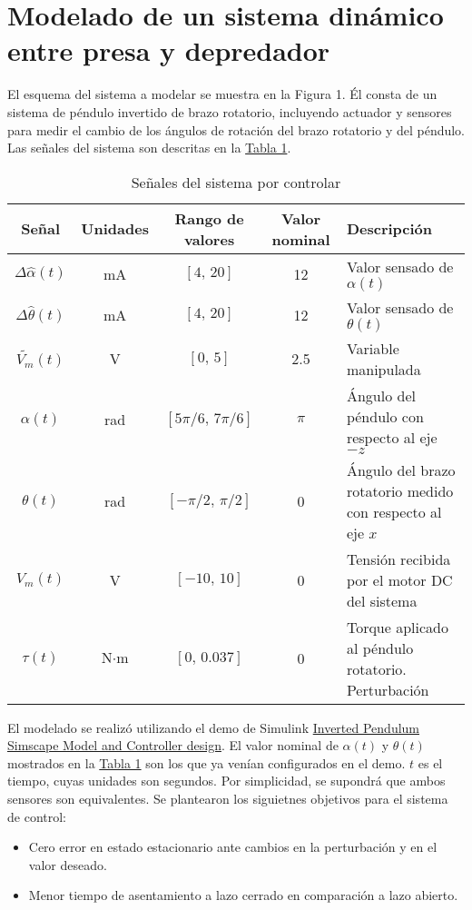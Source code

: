\section{Modelado de un sistema dinámico entre presa y depredador}
El esquema del sistema a modelar se muestra en la Figura 1.
Él consta de un sistema de péndulo invertido de brazo rotatorio, incluyendo actuador y sensores
para medir el cambio de los ángulos de rotación del brazo rotatorio y del péndulo.
Las señales del sistema son descritas en la \hyperref[t1]{Tabla 1}.

\begin{table}
\centering
\begin{tabular}{ccccp{3cm}}
\toprule
Señal &  Unidades & Rango de valores & Valor nominal & Descripción\\
\midrule
$\Delta \hat{\alpha}(t)$ & mA & $[4,\, 20]$ & 12& Valor sensado de $\alpha(t)$\\
$\Delta \hat{\theta}(t)$ & mA & $[ 4,\, 20]$ & 12& Valor sensado de $\theta(t)$\\
$\widetilde{V_m}(t)$ & V & $[0,\, 5]$ & 2.5       & Variable manipulada\\
$\alpha(t)$ & rad & $[ 5\pi/6,\, 7\pi/6]$ & $\pi$                           & Ángulo del péndulo con respecto al eje $-z$\\
$\theta(t)$ & rad & $[-\pi/2,\,\pi/2]$ & 0& Ángulo del brazo rotatorio medido con respecto al eje $x$\\
$V_m(t)$ & V & $[-10,\, 10]$ & 0& Tensión recibida por el motor DC del sistema\\
$\tau(t)$ & $\text{N}\cdot\text{m}$ & $[0,\,0.037]$& 0 & Torque aplicado al péndulo rotatorio. Perturbación\\
\bottomrule
\end{tabular}
\caption{Señales del sistema por controlar}
\label{t1}
\end{table}

El modelado se realizó utilizando el demo de Simulink \href{https://la.mathworks.com/matlabcentral/fileexchange/84175-inverted-pendulum-simscape-model-and-controller-design?requestedDomain=}{Inverted Pendulum Simscape Model and Controller design}.
El valor nominal de $\alpha(t)$ y $\theta(t)$ mostrados en la \hyperref[t1]{Tabla 1} son los que ya venían configurados en el demo.
$t$ es el tiempo, cuyas unidades son segundos.
Por simplicidad, se supondrá que ambos sensores son equivalentes.
Se plantearon los siguietnes objetivos para el sistema de control:
\begin{itemize}
    \item Cero error en estado estacionario ante cambios en la perturbación y en el valor deseado.
    \item Menor tiempo de asentamiento a lazo cerrado en comparación a lazo abierto.
\end{itemize}

